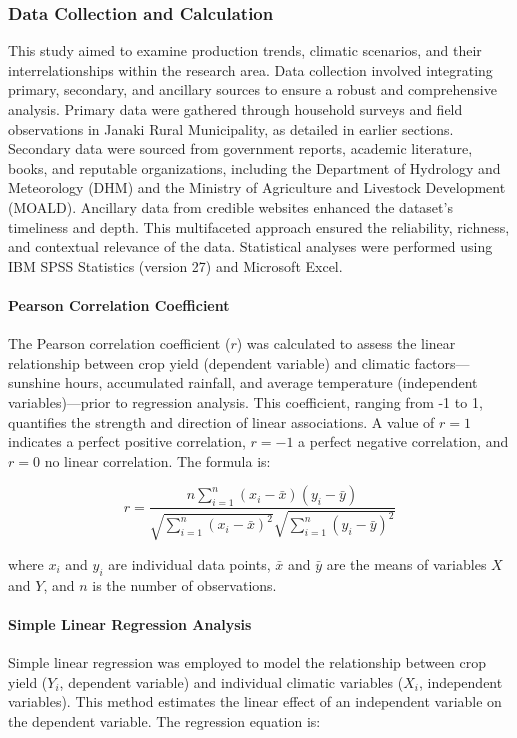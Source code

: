\subsubsection{Data Collection and Calculation}  
This study aimed to examine production trends, climatic scenarios, and their interrelationships within the research area. Data collection involved integrating primary, secondary, and ancillary sources to ensure a robust and comprehensive analysis. Primary data were gathered through household surveys and field observations in Janaki Rural Municipality, as detailed in earlier sections. Secondary data were sourced from government reports, academic literature, books, and reputable organizations, including the Department of Hydrology and Meteorology (DHM) and the Ministry of Agriculture and Livestock Development (MOALD). Ancillary data from credible websites enhanced the dataset’s timeliness and depth. This multifaceted approach ensured the reliability, richness, and contextual relevance of the data. Statistical analyses were performed using IBM SPSS Statistics (version 27) and Microsoft Excel.

\paragraph{Pearson Correlation Coefficient}  
The Pearson correlation coefficient ($r$) was calculated to assess the linear relationship between crop yield (dependent variable) and climatic factors---sunshine hours, accumulated rainfall, and average temperature (independent variables)---prior to regression analysis. This coefficient, ranging from -1 to 1, quantifies the strength and direction of linear associations. A value of $r = 1$ indicates a perfect positive correlation, $r = -1$ a perfect negative correlation, and $r = 0$ no linear correlation. The formula is:

\[
r = \frac{n \sum_{i=1}^{n} (x_i - \bar{x})(y_i - \bar{y})}{\sqrt{\sum_{i=1}^{n} (x_i - \bar{x})^2} \sqrt{\sum_{i=1}^{n} (y_i - \bar{y})^2}}
\]

where $x_i$ and $y_i$ are individual data points, $\bar{x}$ and $\bar{y}$ are the means of variables $X$ and $Y$, and $n$ is the number of observations.

\paragraph{Simple Linear Regression Analysis}  
Simple linear regression was employed to model the relationship between crop yield ($Y_i$, dependent variable) and individual climatic variables ($X_i$, independent variables). This method estimates the linear effect of an independent variable on the dependent variable. The regression equation is:

